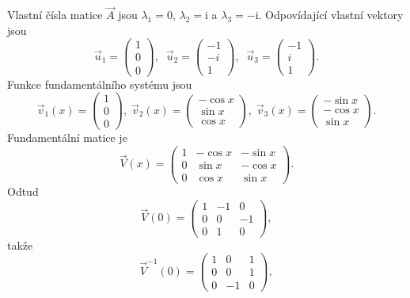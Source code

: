 \begin{sol}
   Vlastní čísla matice $\vec{A}$ jsou $\lambda_1=0$, $\lambda_2=\mathrm{i}$ a $\lambda_3=-\mathrm{i}$.
   Odpovídající vlastní vektory jsou
   \[
      \vec{u}_1 = \begin{pmatrix}1\\0\\0\end{pmatrix}, \;\;
      \vec{u}_2 = \begin{pmatrix}-1\\-i\\1\end{pmatrix}, \;\;
      \vec{u}_3 = \begin{pmatrix}-1\\i\\1\end{pmatrix}.
   \]
   Funkce fundamentálního systému jsou
   \[
      \vec{v}_1(x) = \begin{pmatrix}
         1 \\ 0 \\ 0
      \end{pmatrix},\;
      \vec{v}_2(x) = \begin{pmatrix}
         -\cos x \\ \sin x \\ \cos x
      \end{pmatrix},\;
      \vec{v}_3(x) = \begin{pmatrix}
         -\sin x \\ -\cos x \\ \sin x
      \end{pmatrix}.
   \]
   Fundamentální matice je
   \[
      \vec{V}(x) = \begin{pmatrix}
         1 & -\cos x & -\sin x\\
         0 & \sin x  & -\cos x\\
         0 & \cos x  & \sin x
      \end{pmatrix}.
   \]
   Odtud
   \[
      \vec{V}(0) = \begin{pmatrix}
         1 & -1 & 0\\
         0 & 0  &-1\\
         0 & 1  & 0
      \end{pmatrix},
   \]
   takže
   \[
      \vec{V}^{-1}(0) = \begin{pmatrix}
         1 & 0 & 1\\
         0 & 0  &1\\
         0 & -1  & 0
      \end{pmatrix},
\]
\end{sol}
